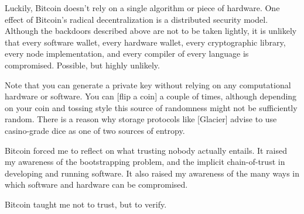Luckily, Bitcoin doesn't rely on a single algorithm or piece of
hardware. One effect of Bitcoin's radical decentralization is a
distributed security model. Although the backdoors described above are
not to be taken lightly, it is unlikely that every software wallet,
every hardware wallet, every cryptographic library, every node
implementation, and every compiler of every language is compromised.
Possible, but highly unlikely.

Note that you can generate a private key without relying on any
computational hardware or software. You can [flip a coin] a couple of
times, although depending on your coin and tossing style this source of
randomness might not be sufficiently random. There is a reason why
storage protocols like [Glacier] advise to use casino-grade dice as one
of two sources of entropy.

Bitcoin forced me to reflect on what trusting nobody actually entails.
It raised my awareness of the bootstrapping problem, and the implicit
chain-of-trust in developing and running software. It also raised my
awareness of the many ways in which software and hardware can be
compromised.

Bitcoin taught me not to trust, but to verify.

%
%
%
%
